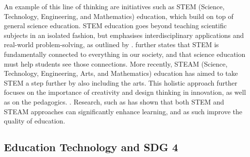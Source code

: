 An example of this line of thinking are initiatives such as STEM (Science, Technology, Engineering, and Mathematics) education, which build on top of general science education. STEM education goes beyond teaching scientific subjects in an isolated fashion, but emphasises interdisciplinary applications and real-world problem-solving, as outlined by \citet{bybee_case_2013, xie_stem_2015, blackley_stem_2015, abdi_tracing_2024}. \citet{deville_stem_2024} further states that STEM is fundamentally connected to everything in our society, and that science education must help students see those connections. More recently, STEAM (Science, Technology, Engineering, Arts, and Mathematics) education has aimed to take STEM a step further by also including the arts. This holistic approach further focuses on the importance of creativity and design thinking in innovation, as well as on the pedagogics. \citep{marin-marin_steam_2021, dolgopolovas_computational_2021, connor_stem_2015, bequette_place_2012}. Research, such as \citet{jamali_role_2023, yakman_exploring_2012, samsudin_effect_2020} has shown that both STEM and STEAM approaches can significantly enhance learning, and as such improve the quality of education.

\subsection{\label{sec:intro_et}Education Technology and SDG 4}%


